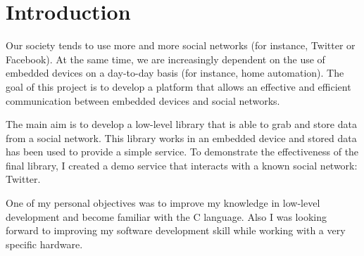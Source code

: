 \chapter{Introduction}

\hspace{15mm}Our society tends to use more and more social networks (for instance, Twitter or Facebook). At the same time, we are increasingly dependent on the use of embedded devices on a day-to-day basis (for instance, home automation). The goal of this project is to develop a platform that allows an effective and efficient communication between embedded devices and social networks.

The main aim is to develop a low-level library that is able to grab and store data from a social network. This library works in an embedded device and stored data has been used to provide a simple service. To demonstrate the effectiveness of the final library, I created a demo service that interacts with a known social network: Twitter.

One of my personal objectives was to improve my knowledge in low-level development and become familiar with the C language. Also I was looking forward to improving my software development skill while working with a very specific hardware.




\clearpage
